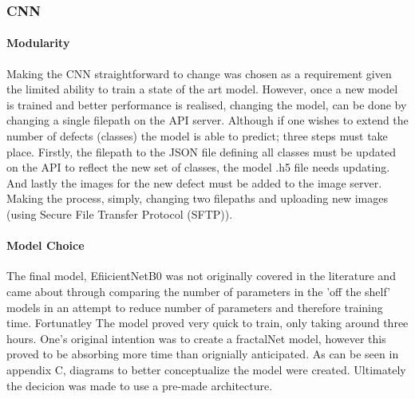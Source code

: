 \subsubsection{CNN}
  \paragraph{Modularity}
  Making the CNN straightforward to change was chosen as a requirement given the limited ability to train a state of the art model. However, once a new model is trained and better performance is realised, changing the model, can be done by changing a single filepath on the API server. Although if one wishes to extend the number of defects (classes) the model is able to predict; three steps must take place. Firstly, the filepath to the JSON file defining all classes must be updated on the API to reflect the new set of classes, the model .h5 file needs updating. And lastly the images for the new defect must be added to the image server. Making the process, simply, changing two filepaths and uploading new images (using Secure File Transfer Protocol (SFTP)).
  \paragraph{Model Choice}
  The final model, EfiicientNetB0 was not originally covered in the literature and came about through comparing the number of parameters in the 'off the shelf' models in an attempt to reduce number of parameters and therefore training time. Fortunatley The model proved very quick to train, only taking around three hours. One's original intention was to create a fractalNet model, however this proved to be absorbing more time than orignially anticipated. As can be seen in appendix C, diagrams to better conceptualize the model were created. Ultimately the decicion was made to use a pre-made architecture.
